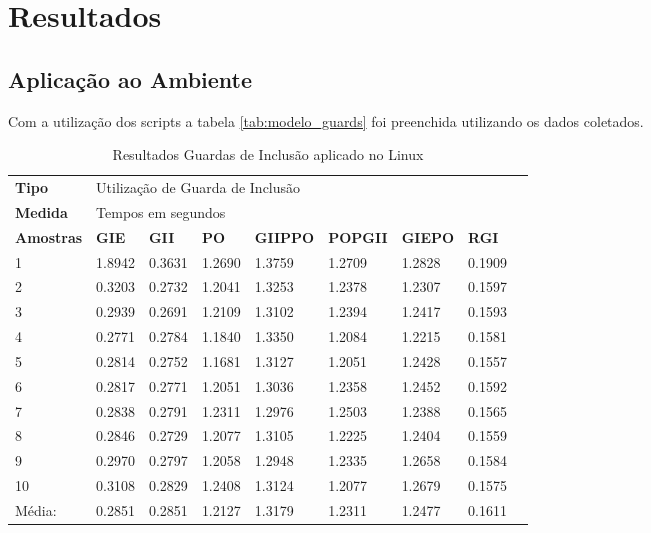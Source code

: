 \chapter[Resultados]{Resultados}


\section{Aplicação ao Ambiente}

Com a utilização dos scripts a tabela \ref{tab:modelo_guards}
 foi preenchida utilizando os dados coletados.


\begin{table}[!ht]
\centering
\caption{Resultados Guardas de Inclusão aplicado no Linux}
\label{tab:resutados_guards_de_inclusao:linux}
\begin{tiny}
\begin{tabular}{lp{1cm}p{1cm}p{1cm}p{1cm}p{1cm}p{1cm}p{1cm}p{1cm}}
\textbf{Tipo} & \multicolumn{7}{l}{Utilização de Guarda de Inclusão} \\
\textbf{Medida} & \multicolumn{7}{l}{Tempos em segundos } \\
\textbf{Amostras} & \textbf{GIE} & \textbf{GII} & \textbf{PO} & 
\textbf{GIIPPO} & \textbf{POPGII} & \textbf{GIEPO} & \textbf{RGI} \\ \toprule
 1      & 1.8942     & 0.3631  & 1.2690    & 1.3759    & 1.2709  & 1.2828     & 0.1909 \\
 2      & 0.3203     & 0.2732  & 1.2041    & 1.3253    & 1.2378  & 1.2307     & 0.1597 \\
 3      & 0.2939     & 0.2691  & 1.2109    & 1.3102    & 1.2394  & 1.2417     & 0.1593 \\
 4      & 0.2771     & 0.2784  & 1.1840    & 1.3350    & 1.2084  & 1.2215     & 0.1581 \\
 5      & 0.2814     & 0.2752  & 1.1681    & 1.3127    & 1.2051  & 1.2428     & 0.1557 \\
 6      & 0.2817     & 0.2771  & 1.2051    & 1.3036    & 1.2358  & 1.2452     & 0.1592 \\
 7      & 0.2838     & 0.2791  & 1.2311    & 1.2976    & 1.2503  & 1.2388     & 0.1565 \\
 8      & 0.2846     & 0.2729  & 1.2077    & 1.3105    & 1.2225  & 1.2404     & 0.1559 \\
 9      & 0.2970     & 0.2797  & 1.2058    & 1.2948    & 1.2335  & 1.2658     & 0.1584  \\
 10     & 0.3108     & 0.2829  & 1.2408    & 1.3124    & 1.2077  & 1.2679     & 0.1575  \\ \bottomrule
 Média: & 0.2851     & 0.2851  & 1.2127    & 1.3179    & 1.2311  & 1.2477     & 0.1611 \\
\end{tabular}
\end{tiny}
\end{table}


